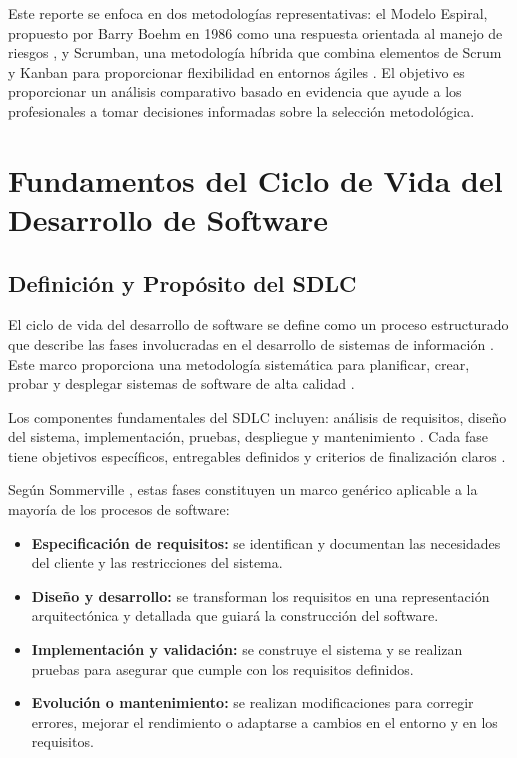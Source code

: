 \documentclass[conference]{IEEEtran}
\begin{document}
Este reporte se enfoca en dos metodologías representativas: el Modelo Espiral, propuesto por Barry Boehm en 1986 como una respuesta orientada al manejo de riesgos \cite{boehm1988spiral}, y Scrumban, una metodología híbrida que combina elementos de Scrum y Kanban para proporcionar flexibilidad en entornos ágiles \cite{zayat2020framework}. El objetivo es proporcionar un análisis comparativo basado en evidencia que ayude a los profesionales a tomar decisiones informadas sobre la selección metodológica.

\section{Fundamentos del Ciclo de Vida del Desarrollo de Software}

\subsection{Definición y Propósito del SDLC}

El ciclo de vida del desarrollo de software se define como un proceso estructurado que describe las fases involucradas en el desarrollo de sistemas de información \cite{contemporary_sdlc_2023}. Este marco proporciona una metodología sistemática para planificar, crear, probar y desplegar sistemas de software de alta calidad \cite{dhiman2024reassessment}.

Los componentes fundamentales del SDLC incluyen: análisis de requisitos, diseño del sistema, implementación, pruebas, despliegue y mantenimiento \cite{wang2025survey}. Cada fase tiene objetivos específicos, entregables definidos y criterios de finalización claros \cite{contemporary_sdlc_2023}. 

Según Sommerville \cite{sommerville2016}, estas fases constituyen un marco genérico aplicable a la mayoría de los procesos de software:

\begin{itemize}
    \item \textbf{Especificación de requisitos:} se identifican y documentan las necesidades del cliente y las restricciones del sistema.
    \item \textbf{Diseño y desarrollo:} se transforman los requisitos en una representación arquitectónica y detallada que guiará la construcción del software.
    \item \textbf{Implementación y validación:} se construye el sistema y se realizan pruebas para asegurar que cumple con los requisitos definidos.
    \item \textbf{Evolución o mantenimiento:} se realizan modificaciones para corregir errores, mejorar el rendimiento o adaptarse a cambios en el entorno y en los requisitos.
\end{itemize}
\end{document}
